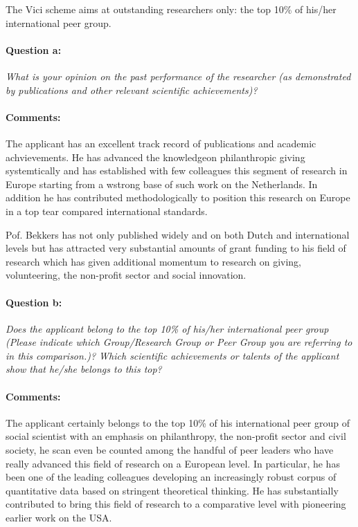 \documentclass[twocolumn, serif, rga, numeric]{jote-article}
\begin{document}
 The Vici scheme aims at outstanding researchers only: the top 10\% of his/her international peer group.
\paragraph{Question a:}
\textit{What is your opinion on the past performance of the researcher (as demonstrated by publications and other relevant scientific achievements)?}
\paragraph{Comments:}
The applicant has an excellent track record of publications and academic achvievements. He has advanced the knowledgeon philanthropic giving systemtically and has established with few colleagues this segment of research in Europe starting from a wstrong base of such work on the Netherlands. In addition he has contributed methodologically to position this research on Europe in a top tear compared international standards.

Pof. Bekkers has not only published widely and on both Dutch and international levels but has attracted very substantial amounts of grant funding to his field of research which has given additional momentum to research on giving, volunteering, the non-profit sector and social innovation.
\paragraph{Question b:}
\textit{Does the applicant belong to the top 10\% of his/her international peer group (Please indicate                    which Group/Research Group or Peer Group you are referring to in this comparison.)? Which scientific achievements or talents of the applicant show that he/she belongs to this top?}
\paragraph{Comments:}
The applicant certainly belongs to the top 10\% of his international peer group of social scientist with an emphasis on philanthropy, the non-profit sector and civil society, he scan even be counted among the handful of peer leaders who have really advanced this field of research on a European level. In particular, he has been one of the leading colleagues developing an increasingly robust corpus of quantitative data based on stringent theoretical thinking. He has substantially contributed to bring this field of research to a comparative level with pioneering earlier work on the USA.
\end{document}
